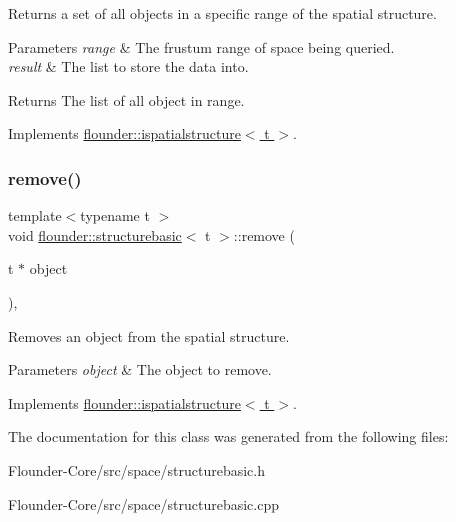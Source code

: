 Returns a set of all objects in a specific range of the spatial structure. 


\begin{DoxyParams}{Parameters}
{\em range} & The frustum range of space being queried. \\
\hline
{\em result} & The list to store the data into. \\
\hline
\end{DoxyParams}
\begin{DoxyReturn}{Returns}
The list of all object in range. 
\end{DoxyReturn}


Implements \hyperlink{classflounder_1_1ispatialstructure_a05119caef7fd1f1677bff025f782506e}{flounder\+::ispatialstructure$<$ t $>$}.

\mbox{\label{classflounder_1_1structurebasic_aad7fb3ea380f8af0bef40f86437db4cb}} 
\subsubsection{\texorpdfstring{remove()}{remove()}}
{\footnotesize\ttfamily template$<$typename t $>$ \\
void \hyperlink{classflounder_1_1structurebasic}{flounder\+::structurebasic}$<$ t $>$\+::remove (\begin{DoxyParamCaption}\item[{t $\ast$}]{object }\end{DoxyParamCaption})\hspace{0.3cm}{\ttfamily [override]}, {\ttfamily [virtual]}}



Removes an object from the spatial structure. 


\begin{DoxyParams}{Parameters}
{\em object} & The object to remove. \\
\hline
\end{DoxyParams}


Implements \hyperlink{classflounder_1_1ispatialstructure_a28ec931fce23b42227a8deac1c576ed3}{flounder\+::ispatialstructure$<$ t $>$}.



The documentation for this class was generated from the following files\+:\begin{DoxyCompactItemize}
\item 
Flounder-\/\+Core/src/space/structurebasic.\+h\item 
Flounder-\/\+Core/src/space/structurebasic.\+cpp\end{DoxyCompactItemize}
